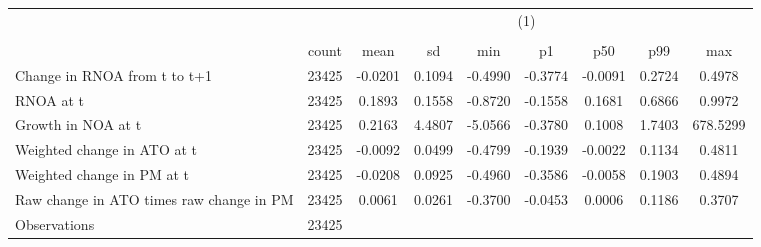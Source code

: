 {
\def\sym#1{\ifmmode^{#1}\else\(^{#1}\)\fi}
\begin{tabular}{l*{1}{cccccccc}}
\hline\hline
                    &\multicolumn{8}{c}{(1)}                                                                                \\
                    &\multicolumn{8}{c}{}                                                                                   \\
                    &       count&        mean&          sd&         min&          p1&         p50&         p99&         max\\
\hline
Change in RNOA from t to t+1&       23425&     -0.0201&      0.1094&     -0.4990&     -0.3774&     -0.0091&      0.2724&      0.4978\\
RNOA at t           &       23425&      0.1893&      0.1558&     -0.8720&     -0.1558&      0.1681&      0.6866&      0.9972\\
Growth in NOA at t  &       23425&      0.2163&      4.4807&     -5.0566&     -0.3780&      0.1008&      1.7403&    678.5299\\
Weighted change in ATO at t&       23425&     -0.0092&      0.0499&     -0.4799&     -0.1939&     -0.0022&      0.1134&      0.4811\\
Weighted change in PM at t&       23425&     -0.0208&      0.0925&     -0.4960&     -0.3586&     -0.0058&      0.1903&      0.4894\\
Raw change in ATO times raw change in PM&       23425&      0.0061&      0.0261&     -0.3700&     -0.0453&      0.0006&      0.1186&      0.3707\\
\hline
Observations        &       23425&            &            &            &            &            &            &            \\
\hline\hline
\end{tabular}
}
